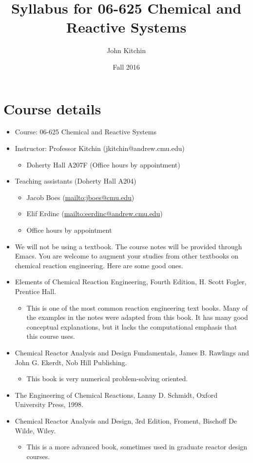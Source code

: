 \documentclass[11pt]{article}
\author{John Kitchin}
\date{Fall 2016}
\title{Syllabus for  06-625 Chemical and Reactive Systems}
\begin{document}
\tableofcontents


\section{Course details}
\label{sec:orgheadline14}
\begin{itemize}
\item Course: 06-625 Chemical and Reactive Systems

\item Instructor: Professor Kitchin (jkitchin@andrew.cmu.edu)
\begin{itemize}
\item Doherty Hall A207F (Office hours by appointment)
\end{itemize}

\item Teaching assistants (Doherty Hall A204)
\begin{itemize}
\item Jacob Boes (\url{mailto:jboes@cmu.edu})
\item Elif Erdinc (\url{mailto:eerdinc@andrew.cmu.edu})
\item Office hours by appointment
\end{itemize}

\item We will not be using a textbook. The course notes will be provided through Emacs. You are welcome to augment your studies from other textbooks on chemical reaction engineering. Here are some good ones.

\item Elements of Chemical Reaction Engineering, Fourth Edition, H. Scott Fogler, Prentice Hall.
\begin{itemize}
\item This is one of the most common reaction engineering text books. Many of the examples in the notes were adapted from this book. It has many good conceptual explanations, but it lacks the computational emphasis that this course uses.
\end{itemize}

\item Chemical Reactor Analysis and Design Fundamentals, James B. Rawlings and John G. Ekerdt, Nob Hill Publishing.
\begin{itemize}
\item This book is very numerical problem-solving oriented.
\end{itemize}

\item The Engineering of Chemical Reactions, Lanny D. Schmidt, Oxford University Press, 1998.

\item Chemical Reactor Analysis and Design, 3rd Edition, Froment, Bischoff De Wilde, Wiley.
\begin{itemize}
\item This is a more advanced book, sometimes used in graduate reactor design courses.
\end{itemize}
\end{itemize}
\end{document}
